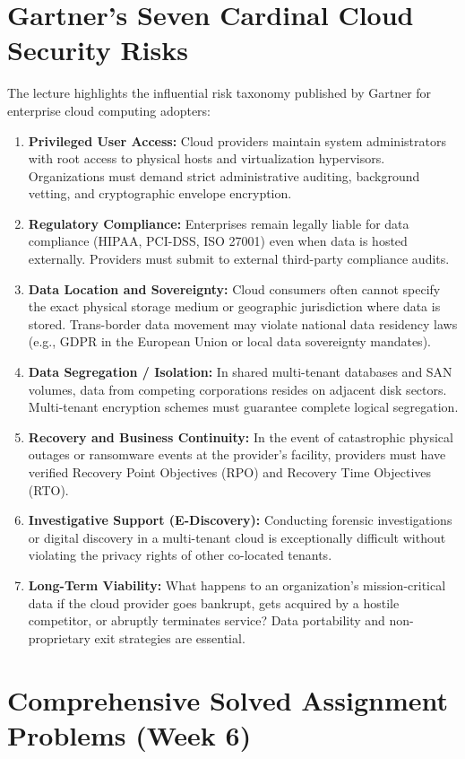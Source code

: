 \section{Gartner's Seven Cardinal Cloud Security Risks}
The lecture highlights the influential risk taxonomy published by Gartner for enterprise cloud computing adopters:
\begin{enumerate}[leftmargin=*]
  \item \textbf{Privileged User Access:} Cloud providers maintain system administrators with root access to physical hosts and virtualization hypervisors. Organizations must demand strict administrative auditing, background vetting, and cryptographic envelope encryption.
  \item \textbf{Regulatory Compliance:} Enterprises remain legally liable for data compliance (HIPAA, PCI-DSS, ISO 27001) even when data is hosted externally. Providers must submit to external third-party compliance audits.
  \item \textbf{Data Location and Sovereignty:} Cloud consumers often cannot specify the exact physical storage medium or geographic jurisdiction where data is stored. Trans-border data movement may violate national data residency laws (e.g., GDPR in the European Union or local data sovereignty mandates).
  \item \textbf{Data Segregation / Isolation:} In shared multi-tenant databases and SAN volumes, data from competing corporations resides on adjacent disk sectors. Multi-tenant encryption schemes must guarantee complete logical segregation.
  \item \textbf{Recovery and Business Continuity:} In the event of catastrophic physical outages or ransomware events at the provider's facility, providers must have verified Recovery Point Objectives (RPO) and Recovery Time Objectives (RTO).
  \item \textbf{Investigative Support (E-Discovery):} Conducting forensic investigations or digital discovery in a multi-tenant cloud is exceptionally difficult without violating the privacy rights of other co-located tenants.
  \item \textbf{Long-Term Viability:} What happens to an organization's mission-critical data if the cloud provider goes bankrupt, gets acquired by a hostile competitor, or abruptly terminates service? Data portability and non-proprietary exit strategies are essential.
\end{enumerate}

\section{Comprehensive Solved Assignment Problems (Week 6)}

